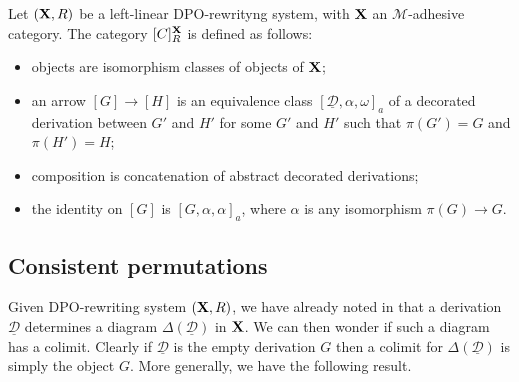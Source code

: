 \documentclass[a4paper,UKenglish,cleveref,pdftex, thm-restate,numberwithinsect]{lipics}
\def\R{\mathsf{R}}
\def\X{\textbf {\textup{X}}}
\newcommand{\dder}[1]{\mathscr{#1}}
\newcommand{\der}[1]{\underline{\dder{#1}}}
\def\dpi{[\mathsf{C}]^{\X}_R}
\begin{document}
\begin{definition}
	Let $(\X, \R)$ be a left-linear DPO-rewrityng system, with $\X$ an $\mathcal{M}$-adhesive category. The  category $\dpi$ is defined as follows:
	\begin{itemize}
		\item objects are isomorphism classes of objects of $\X$;
		\item an arrow $[G]\to [H]$ is an equivalence class $[\der{D}, \alpha, \omega]_a$ of a decorated derivation between $G'$ and $H'$ for some $G'$ and $H'$ such that $\pi(G')=G$ and $\pi(H')=H$;
		\item composition is concatenation of abstract decorated derivations;
		\item the identity on $[G]$ is $[G, \alpha, \alpha]_a$, where $\alpha$ is any isomorphism $\pi(G)\to G$.	\end{itemize}
\end{definition}


\subsection{Consistent permutations}

Given DPO-rewriting system $(\X, \R)$,  we have already noted in  that a derivation $\der{D}$  determines a diagram $\Delta(\der{D})$ in $\X$. We can then wonder if such a diagram has a colimit. Clearly if $\der{D}$ is the empty derivation $G$ then a colimit for $\Delta(\der{D})$ is simply the object $G$. More generally, we have the following result.
\end{document}
